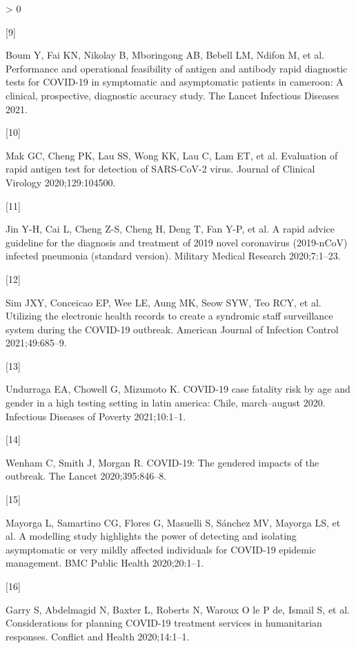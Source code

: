 \documentclass[]{elsarticle} %
\newlength{\cslhangindent}
\newlength{\csllabelwidth}
\newenvironment{CSLReferences}[2] %
 {%
  \setlength{\parindent}{0pt}
  \ifodd #1 \everypar{\setlength{\hangindent}{\cslhangindent}}\ignorespaces\fi
  \ifnum #2 > 0
  \setlength{\parskip}{#2\baselineskip}
  \fi
 }%
 {}
\newcommand{\CSLLeftMargin}[1]{\parbox[t]{\csllabelwidth}{#1}}
\newcommand{\CSLRightInline}[1]{\parbox[t]{\linewidth - \csllabelwidth}{#1}\break}
\begin{document}
\begin{CSLReferences}{0}{0}
\leavevmode\hypertarget{ref-boum2021performance}{}%
\CSLLeftMargin{{[}9{]} }
\CSLRightInline{Boum Y, Fai KN, Nikolay B, Mboringong AB, Bebell LM, Ndifon M, et al. Performance and operational feasibility of antigen and antibody rapid diagnostic tests for COVID-19 in symptomatic and asymptomatic patients in cameroon: A clinical, prospective, diagnostic accuracy study. The Lancet Infectious Diseases 2021.}

\leavevmode\hypertarget{ref-mak2020evaluation}{}%
\CSLLeftMargin{{[}10{]} }
\CSLRightInline{Mak GC, Cheng PK, Lau SS, Wong KK, Lau C, Lam ET, et al. Evaluation of rapid antigen test for detection of SARS-CoV-2 virus. Journal of Clinical Virology 2020;129:104500.}

\leavevmode\hypertarget{ref-jin2020rapid}{}%
\CSLLeftMargin{{[}11{]} }
\CSLRightInline{Jin Y-H, Cai L, Cheng Z-S, Cheng H, Deng T, Fan Y-P, et al. A rapid advice guideline for the diagnosis and treatment of 2019 novel coronavirus (2019-nCoV) infected pneumonia (standard version). Military Medical Research 2020;7:1--23.}

\leavevmode\hypertarget{ref-sim2021utilizing}{}%
\CSLLeftMargin{{[}12{]} }
\CSLRightInline{Sim JXY, Conceicao EP, Wee LE, Aung MK, Seow SYW, Teo RCY, et al. Utilizing the electronic health records to create a syndromic staff surveillance system during the COVID-19 outbreak. American Journal of Infection Control 2021;49:685--9.}

\leavevmode\hypertarget{ref-undurraga2021covid}{}%
\CSLLeftMargin{{[}13{]} }
\CSLRightInline{Undurraga EA, Chowell G, Mizumoto K. COVID-19 case fatality risk by age and gender in a high testing setting in latin america: Chile, march--august 2020. Infectious Diseases of Poverty 2021;10:1--1.}

\leavevmode\hypertarget{ref-wenham2020covid}{}%
\CSLLeftMargin{{[}14{]} }
\CSLRightInline{Wenham C, Smith J, Morgan R. COVID-19: The gendered impacts of the outbreak. The Lancet 2020;395:846--8.}

\leavevmode\hypertarget{ref-mayorga2020modelling}{}%
\CSLLeftMargin{{[}15{]} }
\CSLRightInline{Mayorga L, Samartino CG, Flores G, Masuelli S, Sánchez MV, Mayorga LS, et al. A modelling study highlights the power of detecting and isolating asymptomatic or very mildly affected individuals for COVID-19 epidemic management. BMC Public Health 2020;20:1--1.}

\leavevmode\hypertarget{ref-garry2020considerations}{}%
\CSLLeftMargin{{[}16{]} }
\CSLRightInline{Garry S, Abdelmagid N, Baxter L, Roberts N, Waroux O le P de, Ismail S, et al. Considerations for planning COVID-19 treatment services in humanitarian responses. Conflict and Health 2020;14:1--1.}


\end{CSLReferences}
\end{document}
